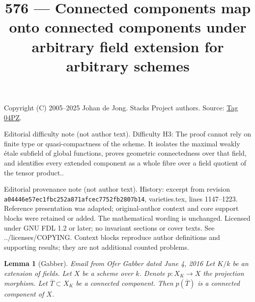 \documentclass{amsart}
\newenvironment{reference}{\comment}{\endcomment}
\theoremstyle{plain}
\newtheorem{lemma}[subsection]{Lemma}
\theoremstyle{definition}
\theoremstyle{remark}
\numberwithin{equation}{subsection}
\begin{document}
\title[Stacks Project, Tag 04PZ]{576 --- Connected components map onto connected components under arbitrary field extension for arbitrary schemes}
\maketitle
\noindent Copyright (C) 2005--2025 Johan de Jong. Stacks Project authors. Source: \href{https://stacks.math.columbia.edu/tag/04PZ}{Tag 04PZ}.

\noindent Editorial difficulty note (not author text). Difficulty H3: The proof cannot rely on finite type or quasi-compactness of the scheme. It isolates the maximal weakly étale subfield of global functions, proves geometric connectedness over that field, and identifies every extended component as a whole fibre over a field quotient of the tensor product..

\noindent Editorial provenance note (not author text). History: excerpt from revision \texttt{a0444\allowbreak 6e57e\allowbreak c1fbc\allowbreak 252a8\allowbreak 71afc\allowbreak ec775\allowbreak 2fb28\allowbreak 07b14}, varieties.tex, lines 1147--1223. Reference presentation was adapted; original-author context and core support blocks were retained or added. The mathematical wording is unchanged. Licensed under GNU FDL 1.2 or later; no invariant sections or cover texts. See ../licenses/COPYING. Context blocks reproduce author definitions and supporting results; they are not additional counted problems.

\begin{lemma}[Gabber]
\label{lemma-image-connected-component}
\begin{reference}
Email from Ofer Gabber dated June 4, 2016
\end{reference}
Let $K/k$ be an extension of fields. Let $X$ be a scheme over $k$.
Denote $p : X_K \to X$ the projection morphism.
Let $\overline{T} \subset X_K$ be a connected component.
Then $p(\overline{T})$ is a connected component of $X$.
\end{lemma}
\end{document}
